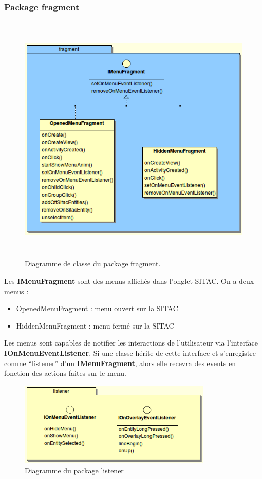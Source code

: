 \documentclass{article}
\begin{document}
\subsubsection{Package fragment}
\begin{figure}[htbp]
\begin{center}
\includegraphics[width=391pt, height=344pt]{doc_dev-fig004.png}
\caption{Diagramme de classe du package fragment.}
\end{center}
\end{figure}

Les \textbf{IMenuFragment} sont des menus affichés dans l’onglet SITAC. On a deux menus :
\begin{itemize}
\item OpenedMenuFragment : menu ouvert sur la SITAC
\item HiddenMenuFragment : menu fermé sur la SITAC
\end{itemize}
Les menus sont capables de notifier les interactions de l’utilisateur via l’interface \textbf{IOnMenuEventListener}. Si une classe hérite de cette interface et s’enregistre comme “listener” d’un \textbf{IMenuFragment}, alors elle recevra des events en fonction des actions faites sur le menu.

\newpage
\begin{figure}[htbp]
\begin{center}
\includegraphics[width=260pt]{doc_dev-fig005.png}
\caption{Diagramme du package listener}
\end{center}
\end{figure}
\end{document}
